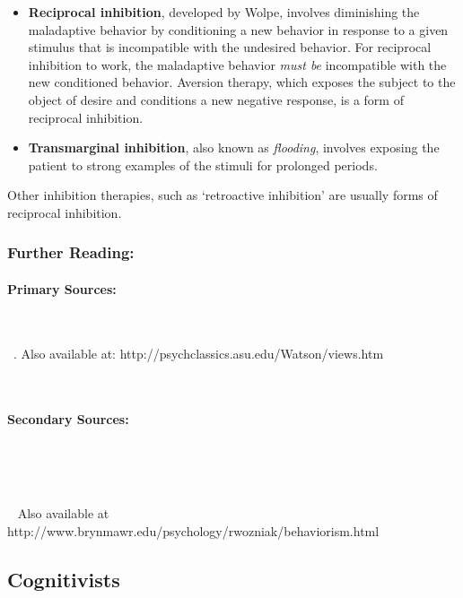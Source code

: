 \begin{refsection}
\begin{itemize}
\item \textbf{Reciprocal inhibition}, developed by Wolpe, involves diminishing the maladaptive behavior by conditioning a new behavior in response to a given stimulus that is incompatible with the undesired behavior. For reciprocal inhibition to work, the maladaptive behavior \emph{must be} incompatible with the new conditioned behavior. Aversion therapy, which exposes the subject to the object of desire and conditions a new negative response, is a form of reciprocal inhibition.

\item \textbf{Transmarginal inhibition}, also known as \emph{flooding}, involves exposing the patient to strong examples of the stimuli for prolonged periods.

\end{itemize}

Other inhibition therapies, such as `retroactive inhibition' are usually forms of reciprocal inhibition.

\subsubsection{Further Reading:}
\label{furtherreading:}

\paragraph{Primary Sources:}
\label{primarysources:}

~\citep{Skinner:2005wr}

~\citep{Watson:1913tq}. Also available at: http:\slash \slash psychclassics.asu.edu\slash Watson\slash views.htm

~\citep{Watson:iMwU-3B8}

\paragraph{Secondary Sources:}
\label{secondarysources:}

~\citep{Hornstein:2002wq}

~\citep{Wolpe:1958vt}

~\citep{Wozniak:1997vj} Also available at http:\slash \slash www.brynmawr.edu\slash psychology\slash rwozniak\slash behaviorism.html

\subsection{Cognitivists}
\label{cognitivists}


\end{refsection}
